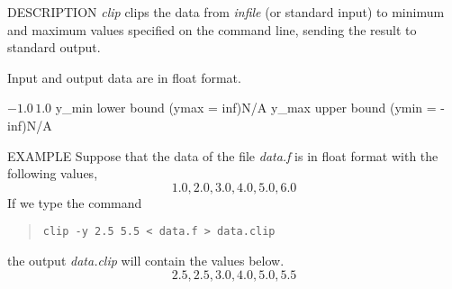 \begin{synopsis}
\item[clip] [ --y $y_{min} \; y_{max}$ ] [ --ymin $y_{min}$ ] [ --ymax $y_{max}$ ] [ {\em infile} ]
\end{synopsis}

\begin{qsection}{DESCRIPTION}
{\em clip} clips the data from {\em infile} (or standard input) 
to minimum and maximum values specified on the command line, 
sending the result to standard output.

Input and output data are in float format.
\end{qsection}

\begin{options}
		{$-1.0 \, 1.0$}
	 {y_{min}} {lower bound (ymax = inf)}{N/A}
	 {y_{max}} {upper bound (ymin = -inf)}{N/A}
\end{options}

\begin{qsection}{EXAMPLE}
Suppose that the data of the file {\em data.f} is in float format
with the following values,
\begin{displaymath}
 1.0, 2.0, 3.0, 4.0, 5.0, 6.0
\end{displaymath}
If we type the command
\begin{quote}
 \verb!clip -y 2.5 5.5 < data.f > data.clip!
\end{quote}
the output {\em data.clip} will contain the values below.
\begin{displaymath}
 2.5, 2.5, 3.0, 4.0, 5.0, 5.5
\end{displaymath}
\end{qsection}
